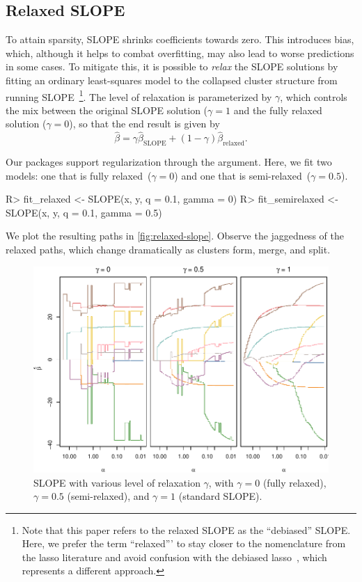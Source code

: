 \documentclass[article]{jss}
\makeatletter
\let\natwidth\Gin@nat@width
\makeatother
\begin{document}

\subsection{Relaxed SLOPE}

To attain sparsity, SLOPE shrinks coefficients towards zero. This introduces
bias, which, although it helps to combat overfitting, may also lead to worse
predictions in some cases. To mitigate this, it is possible to \emph{relax} the
SLOPE solutions by fitting an ordinary least-squares model to the collapsed
cluster structure from running SLOPE~\citep{skalski2022}\footnote{Note that
  this paper refers to the relaxed SLOPE as the ``debiased'' SLOPE. Here, we
  prefer the term ``relaxed''' to stay closer to the nomenclature from the lasso
  literature and avoid confusion with the debiased lasso~\citep{geer2014},
  which represents a different approach.}. The level of relaxation is
parameterized by \(\gamma\), which controls the mix between the original SLOPE
solution (\(\gamma = 1\) and the fully relaxed solution (\(\gamma = 0\)), so
that the end result is given by
%
\[
  \hat{\beta} = \gamma \hat{\beta}_\text{SLOPE} + (1 - \gamma) \hat{\beta}_\text{relaxed}.
\]

Our packages support regularization through the  argument. Here, we
fit two models: one that is fully relaxed~(\(\gamma = 0\)) and one that is
semi-relaxed~(\(\gamma = 0.5\)).

\begin{Code}
R> fit_relaxed <- SLOPE(x, y, q = 0.1, gamma = 0)
R> fit_semirelaxed <- SLOPE(x, y, q = 0.1, gamma = 0.5)
\end{Code}

We plot the resulting paths in \autoref{fig:relaxed-slope}. Observe
the jaggedness of the relaxed paths, which change dramatically
as clusters form, merge, and split.

\begin{figure}[tp]
  \centering
  \includegraphics[width=\natwidth]{images/slope-relaxed.pdf}
  \caption{%
    SLOPE with various level of relaxation \(\gamma\), with
    \(\gamma = 0\) (fully relaxed), \(\gamma = 0.5\) (semi-relaxed),
    and \(\gamma = 1\) (standard SLOPE).
  }
  \label{fig:relaxed-slope}
\end{figure}
\end{document}
